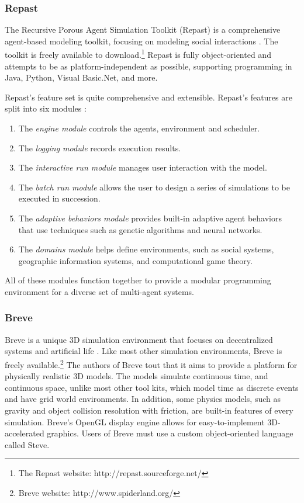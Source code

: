 \subsubsection{Repast}
The Recursive Porous Agent Simulation Toolkit (Repast) is a comprehensive agent-based modeling toolkit, focusing on modeling social interactions \cite{collier2003ref}.
The toolkit is freely available to download.\footnote{The Repast website: http://repast.sourceforge.net/}
Repast is fully object-oriented and attempts to be as platform-independent as possible, supporting programming in Java, Python, Visual Basic.Net, and more.

Repast's feature set is quite comprehensive and extensible. Repast's features are split into six modules \cite{north2006experiences}:
\begin{enumerate}
   \item The \textit{engine module} controls the agents, environment and scheduler.
   \item The \textit{logging module} records execution results.
   \item The \textit{interactive run module} manages user interaction with the model.
   \item The \textit{batch run module} allows the user to design a series of simulations to be executed in succession.
   \item The \textit{adaptive behaviors module} provides built-in adaptive agent behaviors that use techniques such as genetic algorithms and neural networks.
   \item The \textit{domains module} helps define environments, such as social systems, geographic information systems, and computational game theory.
\end{enumerate}
All of these modules function together to provide a modular programming environment for a diverse set of multi-agent systems.
   
\subsubsection{Breve}
Breve is a unique 3D simulation environment that focuses on decentralized systems and artificial life \cite{kleinbreve}.
Like most other simulation environments, Breve is freely available.\footnote{Breve website:  http://www.spiderland.org/}
The authors of Breve tout that it aims to provide a platform for physically realistic 3D models.
The models simulate continuous time, and continuous space, unlike most other tool kits, which model time as discrete events and have grid world environments.
In addition, some physics models, such as gravity and object collision resolution with friction, are built-in features of every simulation.
Breve's OpenGL display engine allows for easy-to-implement 3D-accelerated graphics.
Users of Breve must use a custom object-oriented language called Steve.


